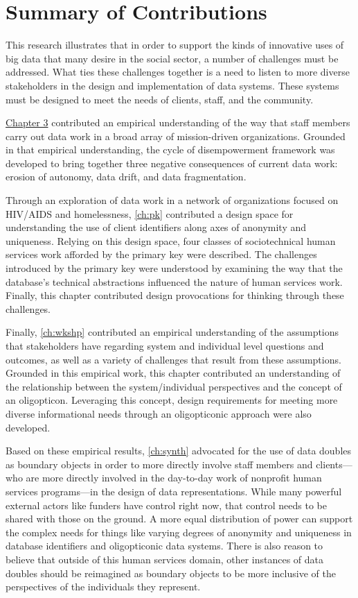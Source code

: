\section{Summary of Contributions}
This research illustrates that in order to support the kinds of innovative uses of big data that many desire in the social sector, a number of challenges must be addressed. What ties these challenges together is a need to listen to more diverse stakeholders in the design and implementation of data systems. These systems must be designed to meet the needs of clients, staff, and the community.

\hyperref[ch:dbd]{Chapter 3} contributed an empirical understanding of the way that staff members carry out data work in a broad array of mission-driven organizations. Grounded in that empirical understanding, the cycle of disempowerment framework was developed to bring together three negative consequences of current data work: erosion of autonomy, data drift, and data fragmentation.

Through an exploration of data work in a network of organizations focused on HIV/AIDS and homelessness, \autoref{ch:pk} contributed a design space for understanding the use of client identifiers along axes of anonymity and uniqueness. Relying on this design space, four classes of sociotechnical human services work afforded by the primary key were described. The challenges introduced by the primary key were understood by examining the way that the database's technical abstractions influenced the nature of human services work. Finally, this chapter contributed design provocations for thinking through these challenges.

Finally, \autoref{ch:wkshp} contributed an empirical understanding of the assumptions that stakeholders have regarding system and individual level questions and outcomes, as well as a variety of challenges that result from these assumptions. Grounded in this empirical work, this chapter contributed an understanding of the relationship between the system/individual perspectives and the concept of an oligopticon. Leveraging this concept, design requirements for meeting more diverse informational needs through an oligopticonic approach were also developed.

Based on these empirical results, \autoref{ch:synth} advocated for the use of data doubles as boundary objects in order to more directly involve staff members and clients---who are more directly involved in the day-to-day work of nonprofit human services programs---in the design of data representations. While many powerful external actors like funders have control right now, that control needs to be shared with those on the ground. A more equal distribution of power can support the complex needs for things like varying degrees of anonymity and uniqueness in database identifiers and oligopticonic data systems. There is also reason to believe that outside of this human services domain, other instances of data doubles should be reimagined as boundary objects to be more inclusive of the perspectives of the individuals they represent.


